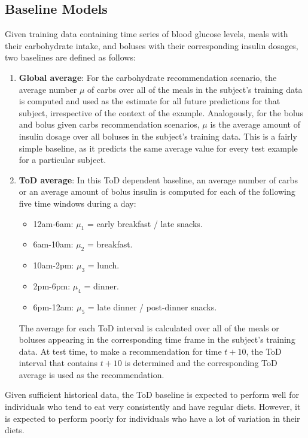 \subsection{Baseline Models}
Given training data containing time series of blood glucose levels, meals with their carbohydrate intake, and boluses with their corresponding insulin dosages, two baselines are defined as follows:
\begin{enumerate}
    \item {\bf Global average}: 
    For the carbohydrate recommendation scenario, the average number $\mu$ of carbs over all of the meals in the subject's training data is computed and used as the estimate for all future predictions for that subject, irrespective of the context of the example. Analogously, for the bolus and bolus given carbs recommendation scenarios, $\mu$ is the average amount of insulin dosage over all boluses in the subject's training data. This is a fairly simple baseline, as it predicts the same average value for every test example for a particular subject.
    
    \item {\bf \ac{ToD} average}: In this \ac{ToD} dependent baseline, an average number of carbs or an average amount of bolus insulin is computed for each of the following five time windows during a day:
	\begin{itemize}
		\item 12am-6am: $\mu_1$ = early breakfast / late snacks.
		\item 6am-10am: $\mu_2$ = breakfast.
		\item 10am-2pm: $\mu_3$ = lunch.
		\item 2pm-6pm: $\mu_4$ = dinner.
		\item 6pm-12am: $\mu_5$ = late dinner / post-dinner snacks.
	\end{itemize}
    The average for each \ac{ToD} interval is calculated over all of the meals or boluses appearing in the corresponding time frame in the subject's training data. At test time, to make a recommendation for time $t+10$, the \ac{ToD} interval that contains $t+10$ is determined and the corresponding \ac{ToD} average is used as the recommendation.
\end{enumerate}
Given sufficient historical data, the \ac{ToD} baseline is expected to perform well for individuals who tend to eat very consistently and have regular diets. However, it is expected to perform poorly for individuals who have a lot of variation in their diets.

